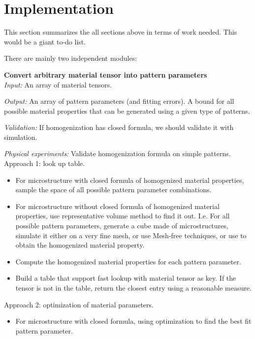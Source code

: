 \section{Implementation}
This section summarizes the all sections above in terms of work needed.  This
would be a giant to-do list.

There are mainly two independent modules:
\begin{description}
\item{\bf Convert arbitrary material tensor into pattern parameters}\\
{\it Input:} An array of material tensors.

{\it Output:} An array of pattern parameters (and fitting errors).  A bound for
all possible material properties that can be generated using a given type of patterns.

{\it Validation:} If homogenization has closed formula, we should validate it
with simulation.

{\it Physical experiments:}  Validate homogenization formula on simple patterns.\\

Approach 1: look up table.
\begin{itemize}
\item For microstructure with closed formula of homogenized material properties,
sample the space of all possible pattern parameter combinations.
\item For microstructure without closed formula of homogenized material
properties, use representative volume method to find it out.  I.e. For all
possible pattern parameters, generate a
cube made of microstructures, simulate it either on a very fine mesh, or use
Mesh-free techniques, or use \cite{Kharevych2009} to obtain the homogenized
material property.
\item Compute the homogenized material properties for each pattern parameter.
\item Build a table that support fast lookup with material tensor as key.  If
the tensor is not in the table, return the closest entry using a reasonable
measure.
\end{itemize}

Approach 2: optimization of material parameters.
\begin{itemize}
\item For microstructure with closed formula, using optimization to find the
best fit pattern parameter.
\end{itemize}


\end{description}
